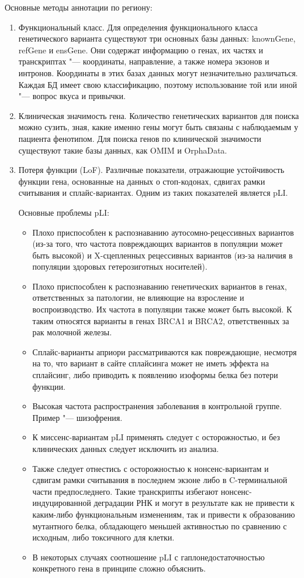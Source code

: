 \documentclass[a4paper,12pt]{article}
\begin{document}
Основные методы аннотации по региону:

\begin{enumerate}
\item Функциональный класс.
Для определения функционального класса генетического варианта существуют три основных базы данных: knownGene, refGene и ensGene.
Они содержат информацию о генах, их частях и транскриптах "--- координаты, направление, а также номера экзонов и интронов.
Координаты в этих базах данных могут незначительно различаться.
Каждая БД имеет свою классификацию, поэтому использование той или иной "--- вопрос вкуса и привычки.

\item Клиническая значимость гена.
Количество генетических вариантов для поиска можно сузить, зная, какие именно гены могут быть связаны с наблюдаемым у пациента фенотипом.
Для поиска генов по клинической значимости существуют такие базы данных, как OMIM и OrphaData.

\item Потеря функции (LoF).
Различные показатели, отражающие устойчивость функции гена, основанные на данных о стоп-кодонах, сдвигах рамки считывания и сплайс-вариантах.
Одним из таких показателей является pLI.

Основные проблемы pLI\cite{Ziegler_2019}:

\begin{itemize}
\item Плохо приспособлен к распознаванию аутосомно-рецессивных вариантов (из-за того, что частота повреждающих вариантов в популяции может быть высокой) и X-сцепленных рецессивных вариантов (из-за наличия в популяции здоровых гетерозиготных носителей).
\item Плохо приспособлен к распознаванию генетических вариантов в генах, ответственных за патологии, не влияющие на взросление и воспроизводство.
Их частота в популяции также может быть высокой.
К таким относятся варианты в генах BRCA1 и BRCA2, ответственных за рак молочной железы.
\item Сплайс-варианты априори рассматриваются как повреждающие, несмотря на то, что вариант в сайте сплайсинга может не иметь эффекта на сплайсинг, либо приводить к появлению изоформы белка без потери функции.
\item Высокая частота распространения заболевания в контрольной группе.
Пример "--- шизофрения.
\item К миссенс-вариантам pLI применять следует с осторожностью, и без клинических данных следует исключить из анализа.
\item Также следует отнестись с осторожностью к нонсенс-вариантам и сдвигам рамки считывания в последнем экзоне либо в C-терминальной части предпоследнего.
Такие транскрипты избегают нонсенс-индуцированной деградации РНК и могут в результате как не привести к каким-либо функциональным изменениям, так и привести к образованию мутантного белка, обладающего меньшей активностью по сравнению с исходным, либо токсичного для клетки.
\item В некоторых случаях соотношение pLI с гаплонедостаточностью конкретного гена в принципе сложно объяснить.
\end{itemize}


\end{enumerate}
\end{document}
